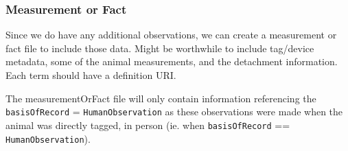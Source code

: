 \documentclass[
]{book}
\newenvironment{Shaded}{\begin{snugshade}}{\end{snugshade}}
\newcommand{\AttributeTok}[1]{\textcolor[rgb]{0.77,0.63,0.00}{#1}}
\newcommand{\ConstantTok}[1]{\textcolor[rgb]{0.00,0.00,0.00}{#1}}
\newcommand{\FunctionTok}[1]{\textcolor[rgb]{0.00,0.00,0.00}{#1}}
\newcommand{\NormalTok}[1]{#1}
\newcommand{\OtherTok}[1]{\textcolor[rgb]{0.56,0.35,0.01}{#1}}
\newcommand{\SpecialCharTok}[1]{\textcolor[rgb]{0.00,0.00,0.00}{#1}}
\newcommand{\StringTok}[1]{\textcolor[rgb]{0.31,0.60,0.02}{#1}}
\begin{document}
\begin{Shaded}
\end{Shaded}

\hypertarget{measurement-or-fact}{%
\subsubsection{Measurement or Fact}\label{measurement-or-fact}}

Since we do have any additional observations, we can create a measurement or fact file to include those data. Might be worthwhile to include tag/device metadata, some of the animal measurements, and the detachment information. Each term should have a definition URI.

The measurementOrFact file will only contain information referencing the \texttt{basisOfRecord} = \texttt{HumanObservation} as these observations were made when the animal was directly tagged, in person (ie. when \texttt{basisOfRecord} == \texttt{HumanObservation}).
\end{document}
